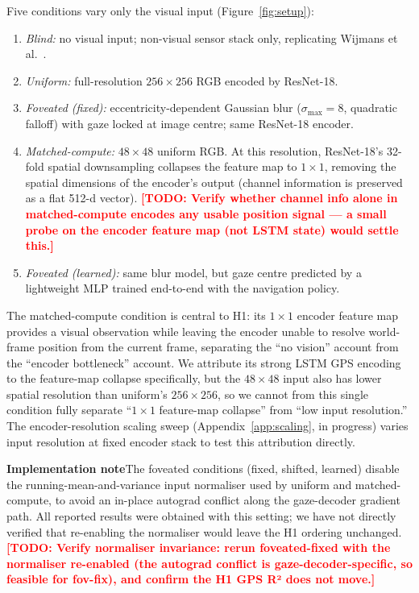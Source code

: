 \documentclass{article}
\newcommand{\TODO}[1]{\textcolor{red}{\textbf{[TODO: #1]}}}
\begin{document}
Five conditions vary only the visual input (Figure~\ref{fig:setup}):
\begin{enumerate}
\itemsep 1pt
    \item \emph{Blind:} no visual input; non-visual sensor stack only, replicating Wijmans et al.~\citep{wijmans2023emergence}.
    \item \emph{Uniform:} full-resolution $256\times 256$ RGB encoded by ResNet-18.
    \item \emph{Foveated (fixed):} eccentricity-dependent Gaussian blur ($\sigma_{\max}=8$, quadratic falloff) with gaze locked at image centre; same ResNet-18 encoder.
    \item \emph{Matched-compute:} $48{\times}48$ uniform RGB. At this resolution, ResNet-18's 32-fold spatial downsampling collapses the feature map to $1{\times}1$, removing the spatial dimensions of the encoder's output (channel information is preserved as a flat 512-d vector). \TODO{Verify whether channel info alone in matched-compute encodes any usable position signal --- a small probe on the encoder feature map (not LSTM state) would settle this.}
    \item \emph{Foveated (learned):} same blur model, but gaze centre predicted by a lightweight MLP trained end-to-end with the navigation policy.
\end{enumerate}
The matched-compute condition is central to H1: its $1{\times}1$ encoder feature map provides a visual observation while leaving the encoder unable to resolve world-frame position from the current frame, separating the ``no vision'' account from the ``encoder bottleneck'' account. We attribute its strong LSTM GPS encoding to the feature-map collapse specifically, but the $48{\times}48$ input also has lower spatial resolution than uniform's $256{\times}256$, so we cannot from this single condition fully separate ``$1{\times}1$ feature-map collapse'' from ``low input resolution.'' The encoder-resolution scaling sweep (Appendix~\ref{app:scaling}, in progress) varies input resolution at fixed encoder stack to test this attribution directly.

\noindent\textbf{Implementation note}\quad The foveated conditions (fixed, shifted, learned) disable the running-mean-and-variance input normaliser used by uniform and matched-compute, to avoid an in-place autograd conflict along the gaze-decoder gradient path. All reported results were obtained with this setting; we have not directly verified that re-enabling the normaliser would leave the H1 ordering unchanged. \TODO{Verify normaliser invariance: rerun foveated-fixed with the normaliser re-enabled (the autograd conflict is gaze-decoder-specific, so feasible for fov-fix), and confirm the H1 GPS R² does not move.}
\end{document}
